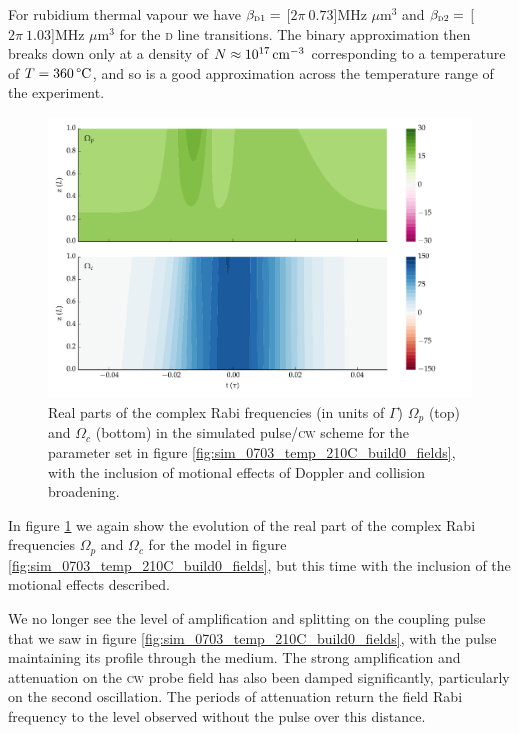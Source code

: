     For rubidium thermal vapour we have $\beta_{\textsc{d1}} = $
    \unit[$2\pi~0.73$]{MHz $\mu$m$^3$}  and $\beta_{\textsc{d2}} = $
    \unit[$2\pi~1.03$]{MHz $\mu$m$^3$} for the \textsc{d} line
    transitions.\cite{Weller2011} The binary approximation then breaks down only
    at a density of $N \approx \unit[10^{17}]{cm^{-3}}$ corresponding to a
    temperature of $T = \unit[360]{\textrm{\textdegree C}}$, and so is a good
    approximation across the temperature range of the experiment.

    \begin{figure}[h]
      \includegraphics[width=\linewidth]{figs/06_simultons/mb_vee2g_build1_15c_130p_0330t_230C_sb50_120vel000_00_002um_fig2.pdf}
      \caption{
      Real parts of the complex Rabi frequencies (in units of $\Gamma$)
      $\Omega_{p}$ (top) and  $\Omega_{c}$ (bottom) in the simulated
      pulse/\textsc{cw} scheme for the parameter set in figure
      \ref{fig:sim_0703_temp_210C_build0_fields}, with the inclusion of motional
      effects of Doppler and collision broadening.
      }
      \label{fig:sim_0703_temp_210C_build2_fields}
    \end{figure}

    In figure \ref{fig:sim_0703_temp_210C_build2_fields} we again show the
    evolution of the real part of the complex Rabi frequencies $\Omega_p$ and
    $\Omega_c$ for the model in figure
    \ref{fig:sim_0703_temp_210C_build0_fields}, but this time with the inclusion
    of the motional effects described. 

    We no longer see the level of amplification and splitting on the coupling
    pulse that we saw in figure \ref{fig:sim_0703_temp_210C_build0_fields}, with
    the pulse maintaining its profile through the medium. The strong
    amplification and attenuation on the \textsc{cw} probe field has also been
    damped significantly, particularly on the second oscillation. The periods of
    attenuation return the field Rabi frequency to the level observed without
    the pulse over this distance.

